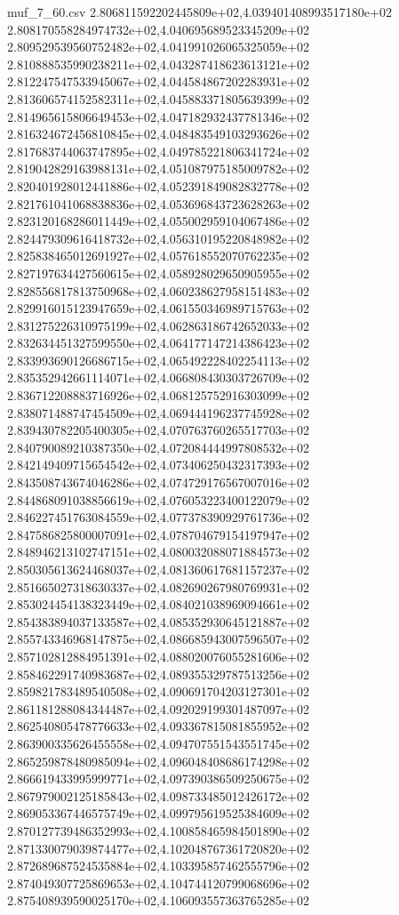 \begin{filecontents*}{muf_7_60.csv}
2.806811592202445809e+02,4.039401408993517180e+02
2.808170558284974732e+02,4.040695689523345209e+02
2.809529539560752482e+02,4.041991026065325059e+02
2.810888535990238211e+02,4.043287418623613121e+02
2.812247547533945067e+02,4.044584867202283931e+02
2.813606574152582311e+02,4.045883371805639399e+02
2.814965615806649453e+02,4.047182932437781346e+02
2.816324672456810845e+02,4.048483549103293626e+02
2.817683744063747895e+02,4.049785221806341724e+02
2.819042829163988131e+02,4.051087975185009782e+02
2.820401928012441886e+02,4.052391849082832778e+02
2.821761041068838836e+02,4.053696843723628263e+02
2.823120168286011449e+02,4.055002959104067486e+02
2.824479309616418732e+02,4.056310195220848982e+02
2.825838465012691927e+02,4.057618552070762235e+02
2.827197634427560615e+02,4.058928029650905955e+02
2.828556817813750968e+02,4.060238627958151483e+02
2.829916015123947659e+02,4.061550346989715763e+02
2.831275226310975199e+02,4.062863186742652033e+02
2.832634451327599550e+02,4.064177147214386423e+02
2.833993690126686715e+02,4.065492228402254113e+02
2.835352942661114071e+02,4.066808430303726709e+02
2.836712208883716926e+02,4.068125752916303099e+02
2.838071488747454509e+02,4.069444196237745928e+02
2.839430782205400305e+02,4.070763760265517703e+02
2.840790089210387350e+02,4.072084444997808532e+02
2.842149409715654542e+02,4.073406250432317393e+02
2.843508743674046286e+02,4.074729176567007016e+02
2.844868091038856619e+02,4.076053223400122079e+02
2.846227451763084559e+02,4.077378390929761736e+02
2.847586825800007091e+02,4.078704679154197947e+02
2.848946213102747151e+02,4.080032088071884573e+02
2.850305613624468037e+02,4.081360617681157237e+02
2.851665027318630337e+02,4.082690267980769931e+02
2.853024454138323449e+02,4.084021038969094661e+02
2.854383894037133587e+02,4.085352930645121887e+02
2.855743346968147875e+02,4.086685943007596507e+02
2.857102812884951391e+02,4.088020076055281606e+02
2.858462291740983687e+02,4.089355329787513256e+02
2.859821783489540508e+02,4.090691704203127301e+02
2.861181288084344487e+02,4.092029199301487097e+02
2.862540805478776633e+02,4.093367815081855952e+02
2.863900335626455558e+02,4.094707551543551745e+02
2.865259878480985094e+02,4.096048408686174298e+02
2.866619433995999771e+02,4.097390386509250675e+02
2.867979002125185843e+02,4.098733485012426172e+02
2.869053367446575749e+02,4.099795619525384609e+02
2.870127739486352993e+02,4.100858465984501890e+02
2.871330079039874477e+02,4.102048767361720820e+02
2.872689687524535884e+02,4.103395857462555796e+02
2.874049307725869653e+02,4.104744120799068696e+02
2.875408939590025170e+02,4.106093557363765285e+02

\end{filecontents*}

